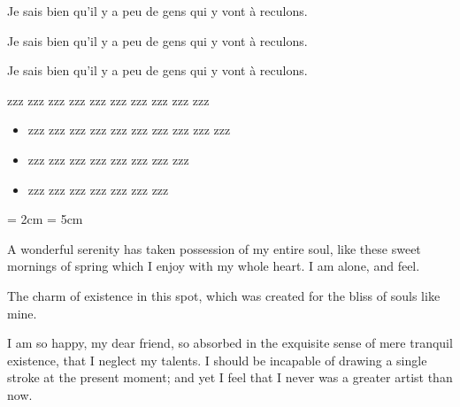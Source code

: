 \documentclass{scrbook}
\begin{document}
\parbox[t]{3cm}{
  Je sais bien qu'il y a peu de gens qui y vont à reculons.
}
\hfill
\parbox[t]{4cm}{
  Je sais bien qu'il y a peu de gens qui y vont à reculons.
}
\hfill
\parbox[t]{5cm}{
  \parindent=2cm
  Je sais bien qu'il y a peu de gens qui y vont à reculons.
}

\vspace{3cm}

\begin{minipage}{5cm}
  zzz zzz zzz zzz zzz zzz zzz zzz zzz zzz

  \begin{itemize}
  \item zzz zzz zzz zzz zzz zzz zzz zzz zzz zzz
  \item zzz zzz zzz zzz zzz zzz zzz zzz
  \item zzz zzz zzz zzz zzz zzz zzz
  \end{itemize}
\end{minipage}

\vspace{3cm}

\ifluatex
  \parindent = 2cm
  \setlength{\lastparlineminlength}{0.5\linewidth}
\else
  \parindent = 5cm
  \the\parfillskip
\fi

A wonderful serenity has taken possession of my entire soul, like these sweet mornings of spring which I enjoy with my whole heart. I am alone, and feel.

The charm of existence in this spot, which was created for the bliss of souls like mine. 

I am so happy, my dear friend, so absorbed in the exquisite sense of mere tranquil existence, that I neglect my talents. I should be
incapable of drawing a single stroke at the present moment; and yet I feel that I never was a greater artist than now.
\end{document}
